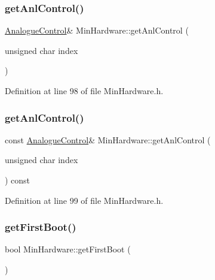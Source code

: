 \subsubsection{\texorpdfstring{get\+Anl\+Control()}{getAnlControl()}\hspace{0.1cm}{\footnotesize\ttfamily [1/2]}}
{\footnotesize\ttfamily \hyperlink{class_analogue_control}{Analogue\+Control}\& Min\+Hardware\+::get\+Anl\+Control (\begin{DoxyParamCaption}\item[{unsigned char}]{index }\end{DoxyParamCaption})\hspace{0.3cm}{\ttfamily [inline]}}



Definition at line 98 of file Min\+Hardware.\+h.

\mbox{\label{class_min_hardware_a795eea6c8e488f0ef2700422b734f4f7}} 
\subsubsection{\texorpdfstring{get\+Anl\+Control()}{getAnlControl()}\hspace{0.1cm}{\footnotesize\ttfamily [2/2]}}
{\footnotesize\ttfamily const \hyperlink{class_analogue_control}{Analogue\+Control}\& Min\+Hardware\+::get\+Anl\+Control (\begin{DoxyParamCaption}\item[{unsigned char}]{index }\end{DoxyParamCaption}) const\hspace{0.3cm}{\ttfamily [inline]}}



Definition at line 99 of file Min\+Hardware.\+h.

\mbox{\label{class_min_hardware_a8227e23999bf74110a124c889c80759e}} 
\subsubsection{\texorpdfstring{get\+First\+Boot()}{getFirstBoot()}}
{\footnotesize\ttfamily bool Min\+Hardware\+::get\+First\+Boot (\begin{DoxyParamCaption}{ }\end{DoxyParamCaption})}



